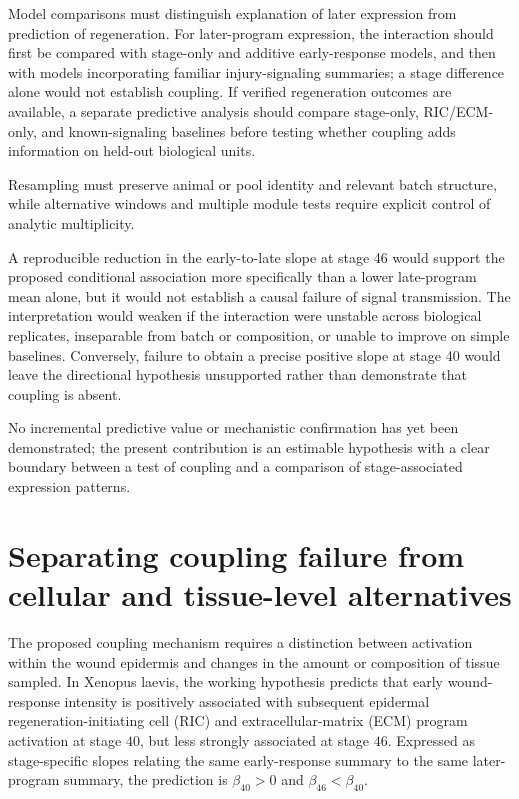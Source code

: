 \documentclass[11pt]{article}
\begin{document}
Model comparisons must distinguish explanation of later expression from prediction of regeneration. For later-program expression, the interaction should first be compared with stage-only and additive early-response models, and then with models incorporating familiar injury-signaling summaries; a stage difference alone would not establish coupling. If verified regeneration outcomes are available, a separate predictive analysis should compare stage-only, RIC/ECM-only, and known-signaling baselines before testing whether coupling adds information on held-out biological units.

Resampling must preserve animal or pool identity and relevant batch structure, while alternative windows and multiple module tests require explicit control of analytic multiplicity.

A reproducible reduction in the early-to-late slope at stage 46 would support the proposed conditional association more specifically than a lower late-program mean alone, but it would not establish a causal failure of signal transmission. The interpretation would weaken if the interaction were unstable across biological replicates, inseparable from batch or composition, or unable to improve on simple baselines. Conversely, failure to obtain a precise positive slope at stage 40 would leave the directional hypothesis unsupported rather than demonstrate that coupling is absent.

No incremental predictive value or mechanistic confirmation has yet been demonstrated; the present contribution is an estimable hypothesis with a clear boundary between a test of coupling and a comparison of stage-associated expression patterns.

\section{Separating coupling failure from cellular and tissue-level alternatives}
The proposed coupling mechanism requires a distinction between activation within the wound epidermis and changes in the amount or composition of tissue sampled. In Xenopus laevis, the working hypothesis predicts that early wound-response intensity is positively associated with subsequent epidermal regeneration-initiating cell (RIC) and extracellular-matrix (ECM) program activation at stage $40$, but less strongly associated at stage $46$. Expressed as stage-specific slopes relating the same early-response summary to the same later-program summary, the prediction is $\beta_{40}>0$ and $\beta_{46}<\beta_{40}$.
\end{document}
